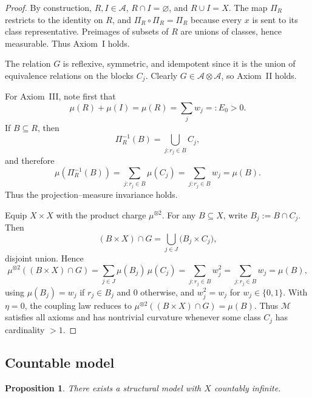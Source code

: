 \documentclass[11pt]{article}
\numberwithin{equation}{section}
\newtheorem{proposition}[theorem]{Proposition}
\theoremstyle{definition}
\begin{document}
\begin{proof}
By construction, $R,I\in\mathcal A$, $R\cap I=\varnothing$, and $R\cup I=X$.
The map $\Pi_R$ restricts to the identity on $R$, and $\Pi_R\circ\Pi_R=\Pi_R$ because
every $x$ is sent to its class representative.
Preimages of subsets of $R$ are unions of classes, hence measurable.
Thus Axiom~I holds.

The relation $G$ is reflexive, symmetric, and idempotent since it is the union of
equivalence relations on the blocks $C_j$.
Clearly $G\in\mathcal A\otimes\mathcal A$, so Axiom~II holds.

For Axiom~III, note first that
\[
\mu(R)+\mu(I) = \mu(R) = \sum_j w_j =:E_0>0.
\]
If $B\subseteq R$, then
\[
\Pi_R^{-1}(B) = \bigcup_{j : r_j\in B} C_j,
\]
and therefore
\[
\mu(\Pi_R^{-1}(B))
= \sum_{j : r_j\in B} \mu(C_j)
= \sum_{j : r_j\in B} w_j
= \mu(B).
\]
Thus the projection--measure invariance holds.

Equip $X\times X$ with the product charge $\mu^{\otimes2}$.
For any $B\subseteq X$, write $B_j:=B\cap C_j$.
Then
\[
(B\times X)\cap G
= \bigcup_{j\in J} \bigl( B_j\times C_j \bigr),
\]
disjoint union.
Hence
\[
\mu^{\otimes2}((B\times X)\cap G)
= \sum_{j\in J} \mu(B_j)\,\mu(C_j)
= \sum_{j : r_j\in B} w_j^2
= \sum_{j : r_j\in B} w_j
= \mu(B),
\]
using $\mu(B_j)=w_j$ if $r_j\in B_j$ and $0$ otherwise, and $w_j^2=w_j$ for $w_j\in\{0,1\}$.
With $\eta=0$, the coupling law reduces to $\mu^{\otimes2}((B\times X)\cap G)=\mu(B)$.
Thus $\mathcal M$ satisfies all axioms and has nontrivial curvature whenever some class
$C_j$ has cardinality $>1$.
\end{proof}

\subsection{Countable model}

\begin{proposition}\label{prop:countable-model}
There exists a structural model with $X$ countably infinite.
\end{proposition}
\end{document}
